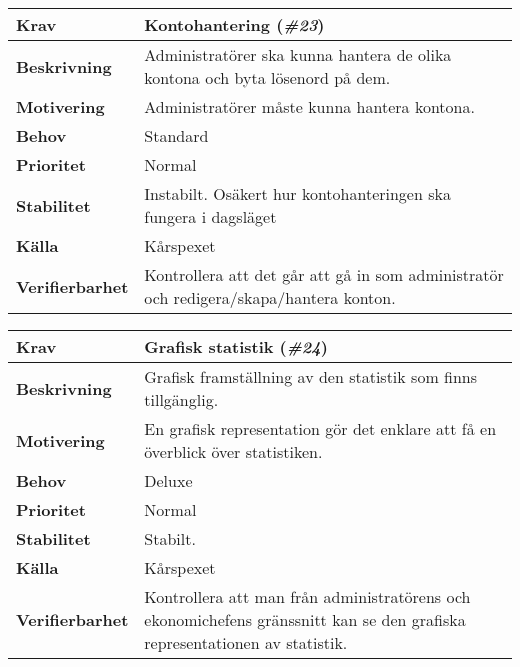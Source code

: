 \documentclass[a4paper, twoside, 11pt, titlepage]{article}
\begin{document}
	\begin{tabular} { p{2.6cm} p{12.5cm} }
		\hline
		\sffamily\textbf{Krav} & Kontohantering (\emph{\#23})  \\
		\hline
		\sffamily\textbf{Beskrivning} & Administratörer ska kunna hantera de olika kontona och byta lösenord på dem.  \\
		\hline
		\sffamily\textbf{Motivering} & Administratörer måste kunna hantera kontona.  \\
		\hline
		\sffamily\textbf{Behov} & Standard  \\
		\hline
		\sffamily\textbf{Prioritet} & Normal  \\
		\hline
		\sffamily\textbf{Stabilitet} & Instabilt. Osäkert hur kontohanteringen ska fungera i dagsläget  \\
		\hline
		\sffamily\textbf{Källa} & Kårspexet  \\
		\hline
		\sffamily\textbf{Verifierbarhet} & Kontrollera att det går att gå in som administratör och redigera/skapa/hantera konton.  \\
		\hline
	\end{tabular}
	\vspace{6mm}

	\begin{tabular} { p{2.6cm} p{12.5cm} }
		\hline
		\sffamily\textbf{Krav} & Grafisk statistik (\emph{\#24})  \\
		\hline
		\sffamily\textbf{Beskrivning} & Grafisk framställning av den statistik som finns tillgänglig.  \\
		\hline
		\sffamily\textbf{Motivering} & En grafisk representation gör det enklare att få en överblick över statistiken.  \\
		\hline
		\sffamily\textbf{Behov} & Deluxe  \\
		\hline
		\sffamily\textbf{Prioritet} & Normal  \\
		\hline
		\sffamily\textbf{Stabilitet} & Stabilt.  \\
		\hline
		\sffamily\textbf{Källa} & Kårspexet  \\
		\hline
		\sffamily\textbf{Verifierbarhet} & Kontrollera att man från administratörens och ekonomichefens gränssnitt kan se den grafiska representationen av statistik.  \\
		\hline
	\end{tabular}
	\vspace{6mm}
\end{document}
